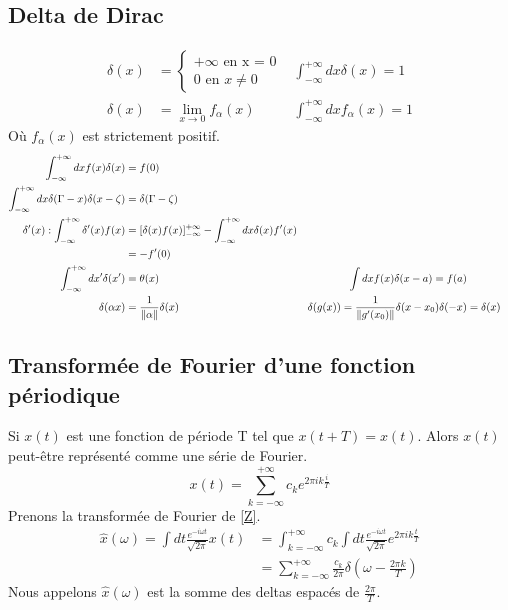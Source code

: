 \documentclass[../notesdecours.tex]{subfiles}
\begin{document}
\subsection{Delta de Dirac}
\begin{align}
\delta(x) &= \begin{cases}
+\infty \mbox{ en x = 0}\\
0 \mbox{ en } x\neq 0
\end{cases}		&\int^{+\infty}_{-\infty} dx \delta (x) = 1\\
\delta(x) &= \lim_{x\to 0} f_{\alpha}(x)	&\int^{+\infty}_{-\infty} dx f_\alpha (x) = 1
\end{align}
Où $f_\alpha (x)$ est strictement positif.
\begin{align}
\int_{-\infty}^{+\infty} dx f(x)\delta(x) &= f(0)\\
\int_{-\infty}^{+\infty} dx \delta(\Gamma - x)\delta(x- \zeta) &= \delta (\Gamma - \zeta)\\
\delta '(x) : \int^{+\infty}_{-\infty} \delta '(x)f(x) &= [\delta(x)f(x)]_{-\infty}^{+\infty} - \int_{-\infty}^{+\infty} dx \delta(x)f'(x)\\
&= -f'(0)\\
\int_{-\infty}^{+\infty} dx' \delta(x') &= \theta(x)		&\int dx f(x)\delta(x-a) = f(a)\\
\delta(\alpha x) &= \frac{1}{\norm{\alpha}}\delta(x)	&\delta(g(x)) = \frac{1}{\norm{g'(x_0)}}\delta(x-x_0)
\delta(-x) &= \delta(x)\\
\end{align}

\subsection{Transformée de Fourier d'une fonction périodique}
Si $x(t)$ est une fonction de période T tel que $x(t+T) = x(t)$. Alors $x(t)$ peut-être représenté comme une série de Fourier.
\begin{equation}
x(t) = \sum_{k = -\infty}^{+\infty} c_ke^{2\pi ik\frac{i}{T}}
\label{Z}
\end{equation}
Prenons la transformée de Fourier de \eqref{Z}.
\begin{align}
\hat{x} (\omega ) = \int dt \frac{e^{-i\omega t}}{\sqrt{2\pi}} x(t) &= \int_{k = -\infty}^{+\infty} c_k \int dt \frac{e^{-i\omega t}}{\sqrt{2\pi}}e^{2\pi i k \frac{t}{T}}\\
&= \sum_{k = -\infty}^{+\infty} \frac{c_k}{2\pi} \delta (\omega - \frac{2\pi k}{T})
\end{align}
Nous appelons $\hat{x}(\omega)$ est la somme des deltas espacés de $\frac{2\pi}{T}$.
\end{document}
